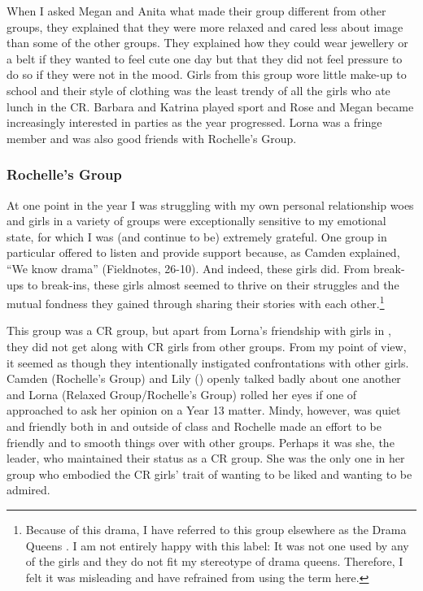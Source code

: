 
When I asked Megan and Anita what made their group different from other groups, they explained that they were more relaxed and cared less about image than some of the other groups. They explained how they could wear jewellery or a belt if they wanted to feel cute one day but that they did not feel pressure to do so if they were not in the mood. Girls from this group wore little make-up to school and their style of clothing was the least trendy of all the girls who ate lunch in the CR. Barbara and Katrina played sport and Rose and Megan became increasingly interested in parties as the year progressed. Lorna was a fringe member and was also good friends with Rochelle's Group.

\subsubsection{Rochelle's Group}
At one point in the year I was struggling with my own personal relationship woes and girls in a variety of groups were exceptionally sensitive to my emotional state, for which I was (and continue to be) extremely grateful. One group in particular offered to listen and provide support because, as Camden explained, ``We know drama'' (Fieldnotes, 26-10). And indeed, these girls did. From break-ups to break-ins, these girls almost seemed to thrive on their struggles and the mutual fondness they gained through sharing their stories with each other.\footnote{Because of this drama, I have referred to this group elsewhere as the Drama Queens \citep{drager2008lsa}. I am not entirely happy with this label: It was not one used by any of the girls and they do not fit my stereotype of drama queens. Therefore, I felt it was misleading and have refrained from using the term here.}

This group was a CR group, but apart from Lorna's friendship with girls in , they did not get along with CR girls from other groups. From my point of view, it seemed as though they intentionally instigated confrontations with other girls. Camden (Rochelle's Group) and Lily () openly talked badly about one another and Lorna (Relaxed Group/Rochelle's Group) rolled her eyes if one of  approached to ask her opinion on a Year 13 matter. Mindy, however, was quiet and friendly both in and outside of class and Rochelle made an effort to be friendly and to smooth things over with other groups. Perhaps it was she, the leader, who maintained their status as a CR group. She was the only one in her group who embodied the CR girls' trait of wanting to be liked and wanting to be admired.
 
